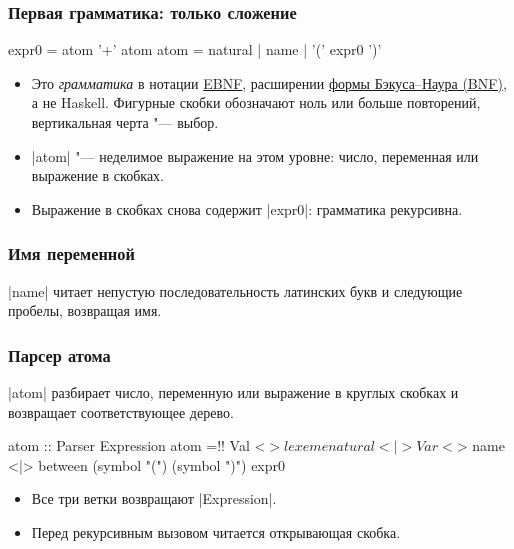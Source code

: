 \documentclass[11pt]{beamer}
\begin{document}
\begin{frame}[fragile]
  \frametitle{Первая грамматика: только сложение}
  \begin{haskell}
    expr0 = atom { '+' atom }
    atom  = natural | name | '(' expr0 ')'
  \end{haskell}
  \begin{itemize}
    \item Это \emph{грамматика} в нотации \href{https://en.wikipedia.org/wiki/Extended_Backus\%E2\%80\%93Naur_form}{EBNF}, расширении \href{https://en.wikipedia.org/wiki/Backus\%E2\%80\%93Naur_form}{формы Бэкуса--Наура (BNF)}, а не Haskell. Фигурные скобки обозначают ноль или больше повторений, вертикальная черта "--- выбор.
      \pause
    \item \haskinline|atom| "--- неделимое выражение на этом уровне: число, переменная или выражение в скобках.
    \item Выражение в скобках снова содержит \haskinline|expr0|: грамматика рекурсивна.
  \end{itemize}
\end{frame}

\begin{frame}[fragile]
  \frametitle{Имя переменной}
  \haskinline|name| читает непустую последовательность латинских букв и следующие пробелы, возвращая имя.
  \pause
\end{frame}

\begin{frame}[fragile]
  \frametitle{Парсер атома}
  \haskinline|atom| разбирает число, переменную или выражение в круглых скобках и возвращает соответствующее дерево.
  \pause
  \begin{haskellsmall}
    atom :: Parser Expression
    atom =!\pause! Val <$> lexeme natural
       <|> Var <$> name
       <|> between (symbol "(") (symbol ")") expr0
  \end{haskellsmall}
  \begin{itemize}
    \item Все три ветки возвращают \haskinline|Expression|.
    \item Перед рекурсивным вызовом читается открывающая скобка.
  \end{itemize}
\end{frame}
\end{document}
